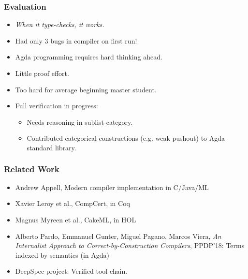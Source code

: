 \documentclass[t,fleqn,usenames,dvipsnames]{beamer}
\newcommand{\cAnn}{\color{red!80!black}}%
\renewcommand{\emph}[1]{{\cAnn#1}}
\newcommand{\cType}{\color{orange!60!black}}
\renewcommand{\emph}[1]{\textit{\cType#1}}
\begin{document}
\begin{frame}%
  \frametitle{Evaluation}
  \vspace{-3ex}
  \begin{itemize}
  \item \emph{When it type-checks, it works.}
  \item Had only 3 bugs in compiler on first run!
  \item Agda programming requires hard thinking ahead.
  \item Little proof effort.
  \item Too hard for average beginning master student.
  \item Full verification in progress:
    \begin{itemize}
    \item Needs reasoning in sublist-category.
    \item Contributed categorical constructions (e.g. weak pushout) to Agda standard library.
    \end{itemize}
  \end{itemize}
\end{frame}





\begin{frame}%
  \frametitle{Related Work}
  \begin{itemize}
  \item Andrew Appell, Modern compiler implementation in C/Java/ML
  \item Xavier Leroy et al., CompCert, in Coq
  \item Magnus Myreen et al., CakeML, in HOL
  \item Alberto Pardo, Emmanuel Gunter, Miguel Pagano, Marcos Viera,
\emph{An Internalist Approach to Correct-by-Construction Compilers},  PPDP'18:
Terms indexed by semantics (in Agda)
  \item DeepSpec project: Verified tool chain.
  \end{itemize}
\end{frame}
\end{document}
